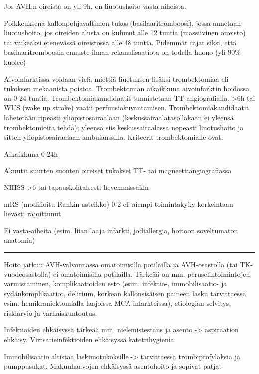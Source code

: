 \documentclass[
]{book}
\begin{document}
Jos AVH:n oireista on yli 9h, on liuotushoito vasta-aiheista.

Poikkeuksena kallonpohjavaltimon tukos (basilaaritromboosi), jossa annetaan liuotushoito, jos oireiden alusta on kulunut alle 12 tuntia (massiivinen oireisto) tai vaikeaksi etenevässä oireistossa alle 48 tuntia. Pidemmät rajat siksi, että basilaaritromboosin ennuste ilman rekanalisaatiota on todella huono (yli 90\% kuolee)

Aivoinfarktissa voidaan vielä miettiä liuotuksen lisäksi trombektomiaa eli tukoksen mekaanista poistoa. Trombektomian aikaikkuna aivoinfarktin hoidossa on 0-24 tuntia. Trombektomiakandidaatit tunnistetaan TT-angiografialla. \textgreater6h tai WUS (wake up stroke) vaatii perfuusiokuvantamisen. Trombektomiakandidaatit lähetetään ripeästi yliopistosairaalaan (keskussairaalatasollakaan ei yleensä trombektomioita tehdä); yleensä siis keskussairaalassa nopeasti liuotushoito ja sitten yliopistosairaalaan ambulanssilla. Kriteerit trombektomialle ovat:

Aikaikkuna 0-24h

Akuutit suurten suonten oireiset tukokset TT- tai magneettiangiografiassa

NIHSS \textgreater6 tai tapauskohtaisesti lievemmissäkin

mRS (modifioitu Rankin asteikko) 0-2 eli aiempi toimintakyky korkeintaan lievästi rajoittunut

Ei vasta-aiheita (esim. liian laaja infarkti, jodiallergia, hoitoon soveltumaton anatomia)

\begin{center}\rule{0.5\linewidth}{0.5pt}\end{center}

Hoito jatkuu AVH-valvonnassa omatoimisilla potilailla ja AVH-osastolla (tai TK-vuodeosastolla) ei-omatoimisilla potilailla. Tärkeää on mm. peruselintoimintojen varmistaminen, komplikaatioiden esto (esim. infektio-, immobilisaatio- ja sydänkomplikaatiot, delirium, korkean kallonsisäisen paineen lasku tarvittaessa esim. hemikraniektomialla laajoissa MCA-infarkteissa), etiologian selvitys, riskiarvio ja varhaiskuntoutus.

Infektioiden ehkäisyssä tärkeää mm. nielemistestaus ja asento -\textgreater{} aspiraation ehkäisy. Virtsatieinfektioiden ehkäisyssä katetrihygienia

Immobilisaatio altistaa laskimotukoksille -\textgreater{} tarvittaessa trombiprofylaksia ja pumppusukat. Makuuhaavojen ehkäisyssä asentohoito ja sopivat patjat
\end{document}
